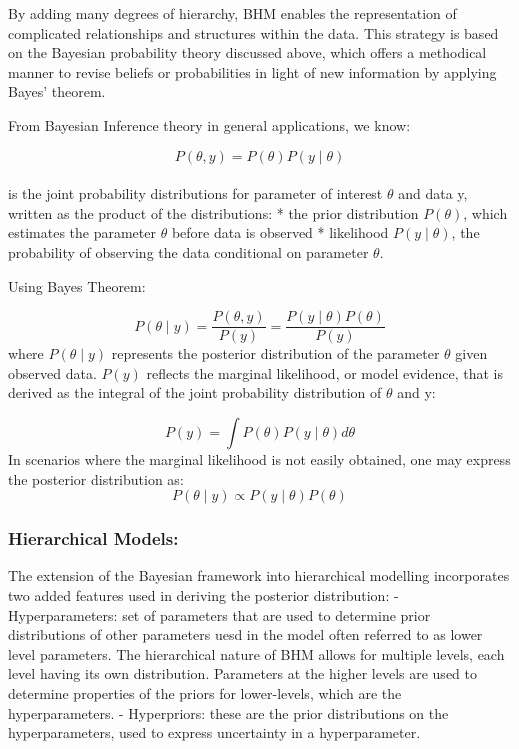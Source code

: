 \documentclass[
]{article}
\begin{document}
By adding many degrees of hierarchy, BHM enables the representation of
complicated relationships and structures within the data. This strategy
is based on the Bayesian probability theory discussed above, which
offers a methodical manner to revise beliefs or probabilities in light
of new information by applying Bayes' theorem.

From Bayesian Inference theory in general applications, we know:

\[P(\theta ,y)=P(\theta)P(y\mid \theta)\]\\
is the joint probability distributions for parameter of interest
\(\theta\) and data y, written as the product of the distributions: *
the prior distribution \(P(\theta)\), which estimates the parameter
\(\theta\) before data is observed * likelihood \(P(y\mid \theta)\), the
probability of observing the data conditional on parameter \(\theta\).

Using Bayes Theorem:

\[P(\theta\mid y) = \frac{P(\theta,y)}{P(y)} = \frac{P(y\mid \theta)P(\theta)}{P(y)}\]
where \(P(\theta\mid y)\) represents the posterior distribution of the
parameter \(\theta\) given observed data. \(P(y)\) reflects the marginal
likelihood, or model evidence, that is derived as the integral of the
joint probability distribution of \(\theta\) and y:

\[ P(y) = \int P(\theta)P(y\mid \theta) d\theta\] In scenarios where the
marginal likelihood is not easily obtained, one may express the
posterior distribution as:
\[P(\theta\mid y) \propto P(y\mid \theta) P(\theta) \]

\hypertarget{hierarchical-models}{%
\subsubsection{Hierarchical Models:}\label{hierarchical-models}}

The extension of the Bayesian framework into hierarchical modelling
incorporates two added features used in deriving the posterior
distribution: - Hyperparameters: set of parameters that are used to
determine prior distributions of other parameters uesd in the model
often referred to as lower level parameters. The hierarchical nature of
BHM allows for multiple levels, each level having its own distribution.
Parameters at the higher levels are used to determine properties of the
priors for lower-levels, which are the hyperparameters. - Hyperpriors:
these are the prior distributions on the hyperparameters, used to
express uncertainty in a hyperparameter.
\end{document}
